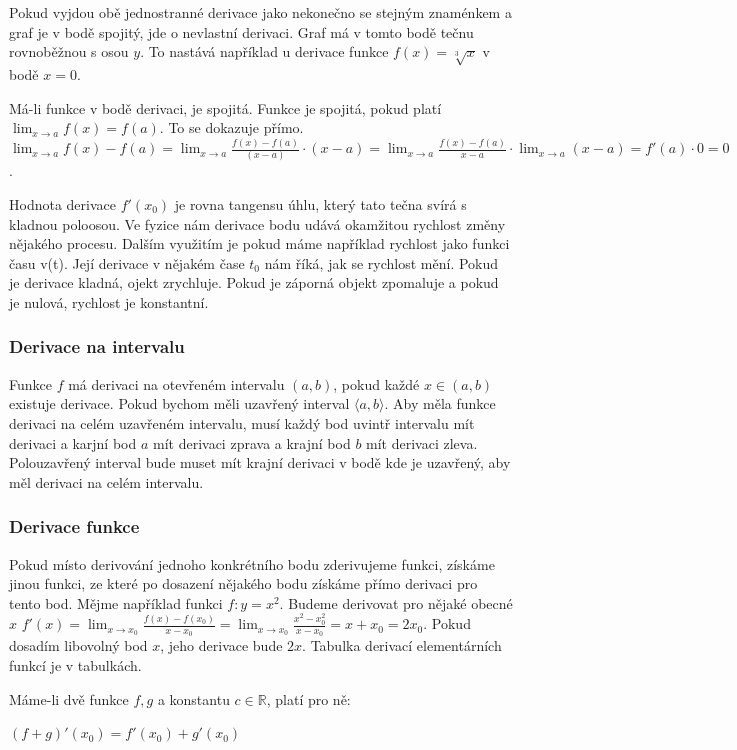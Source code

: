 \documentclass[12pt]{article}
\begin{document}
Pokud vyjdou obě jednostranné derivace jako nekonečno se stejným znaménkem a graf je v bodě
spojitý, jde o nevlastní derivaci. Graf má v tomto bodě tečnu rovnoběžnou s osou $y$.
To nastává například u derivace funkce $f(x) = \sqrt[3]{x}$ v bodě $x = 0$.

Má-li funkce v bodě derivaci, je spojitá. Funkce je spojitá, pokud platí $\lim_{x \to a}f(x) = f(a)$.
To se dokazuje přímo. $\lim_{x \to a} f(x) - f(a) = \lim_{x \to a} \frac{f(x) - f(a)}{(x - a)} \cdot
(x-a) = \lim_{x \to a} \frac{f(x) - f(a)}{x - a} \cdot \lim_{x \to a}(x-a) = f'(a) \cdot 0 = 0$.

Hodnota derivace $f'(x_0)$ je rovna tangensu úhlu, který tato tečna svírá s kladnou poloosou. Ve
fyzice nám derivace bodu udává okamžitou rychlost změny nějakého procesu. Dalším využitím je pokud
máme například rychlost jako funkci času v(t). Její derivace v nějakém čase $t_0$ nám říká, jak
se rychlost mění. Pokud je derivace kladná, ojekt zrychluje. Pokud je záporná objekt zpomaluje a pokud
je nulová, rychlost je konstantní.
\subsubsection*{Derivace na intervalu}
Funkce $f$ má derivaci na otevřeném intervalu $(a, b)$, pokud každé $x \in (a,b)$ existuje derivace.
Pokud bychom měli uzavřený interval $\langle a, b \rangle$. Aby měla funkce derivaci na celém
uzavřeném intervalu, musí každý bod uvintř intervalu mít derivaci a karjní bod $a$ mít derivaci
zprava a krajní bod $b$ mít derivaci zleva. Polouzavřený interval bude muset mít krajní derivaci
v bodě kde je uzavřený, aby měl derivaci na celém intervalu.
\subsubsection*{Derivace funkce}
Pokud místo derivování jednoho konkrétního bodu zderivujeme funkci, získáme jinou funkci, ze které
po dosazení nějakého bodu získáme přímo derivaci pro tento bod. Mějme například funkci $f: y = x^2$.
Budeme derivovat pro nějaké obecné $x$ $f'(x) = \lim_{x \to x_0}\frac{f(x) - f(x_0)}{x - x_0} =
\lim_{x \to x_0} \frac{x^2 - x_0^2}{x - x_0} = x + x_0 = 2x_0$. Pokud dosadím libovolný bod $x$, jeho
derivace bude $2x$. Tabulka derivací elementárních funkcí je v tabulkách.

Máme-li dvě funkce $f, g$ a konstantu $c \in \mathbb{R}$, platí pro ně:

$(f+g)'(x_0) = f'(x_0) + g'(x_0)$
\end{document}
